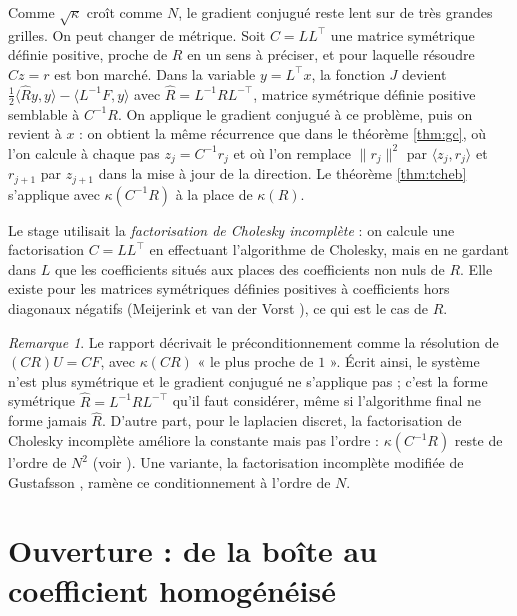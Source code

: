 \documentclass[11pt,a4paper]{article}
\theoremstyle{plain}
\theoremstyle{definition}
\theoremstyle{remark}
\newtheorem{remarque}[theoreme]{Remarque}
\newcommand{\ps}[2]{\langle #1,#2\rangle}
\begin{document}
Comme $\sqrt\kappa$ croît comme $N$, le gradient conjugué reste lent sur de très grandes grilles. On peut changer de métrique. Soit $C=LL^\top$ une matrice symétrique définie positive, proche de $R$ en un sens à préciser, et pour laquelle résoudre $Cz=r$ est bon marché. Dans la variable $y=L^\top x$, la fonction $J$ devient $\frac12\ps{\hat Ry}{y}-\ps{L^{-1}F}{y}$ avec $\hat R=L^{-1}RL^{-\top}$, matrice symétrique définie positive semblable à $C^{-1}R$. On applique le gradient conjugué à ce problème, puis on revient à $x$ : on obtient la même récurrence que dans le théorème \ref{thm:gc}, où l'on calcule à chaque pas $z_j=C^{-1}r_j$ et où l'on remplace $\|r_j\|^2$ par $\ps{z_j}{r_j}$ et $r_{j+1}$ par $z_{j+1}$ dans la mise à jour de la direction. Le théorème \ref{thm:tcheb} s'applique avec $\kappa(C^{-1}R)$ à la place de $\kappa(R)$.

Le stage utilisait la \emph{factorisation de Cholesky incomplète} : on calcule une factorisation $C=LL^\top$ en effectuant l'algorithme de Cholesky, mais en ne gardant dans $L$ que les coefficients situés aux places des coefficients non nuls de $R$. Elle existe pour les matrices symétriques définies positives à coefficients hors diagonaux négatifs (Meijerink et van der Vorst \cite{mvdv}), ce qui est le cas de $R$.

\begin{remarque}
Le rapport décrivait le préconditionnement comme la résolution de $(CR)U=CF$, avec $\kappa(CR)$ « le plus proche de $1$ ». Écrit ainsi, le système n'est plus symétrique et le gradient conjugué ne s'applique pas ; c'est la forme symétrique $\hat R=L^{-1}RL^{-\top}$ qu'il faut considérer, même si l'algorithme final ne forme jamais $\hat R$. D'autre part, pour le laplacien discret, la factorisation de Cholesky incomplète améliore la constante mais pas l'ordre : $\kappa(C^{-1}R)$ reste de l'ordre de $N^2$ (voir \cite{saad}). Une variante, la factorisation incomplète modifiée de Gustafsson \cite{gustafsson}, ramène ce conditionnement à l'ordre de $N$.
\end{remarque}

\section{Ouverture : de la boîte au coefficient homogénéisé}
\end{document}

